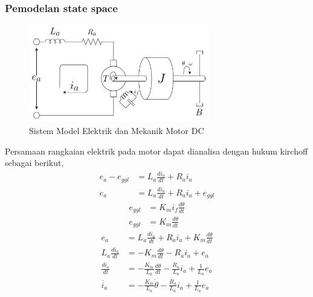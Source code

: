 \documentclass[../main.tex]{subfiles}
\begin{document}
            \subsubsection{Pemodelan state space}
                \begin{figure}[H]
                    \centering\includegraphics[width = 0.7\textwidth]{assets/image/pemodelan_motor.png}
                    \caption{Sistem Model Elektrik dan Mekanik Motor DC}
                    \label{gambar_1}
                \end{figure}
                Persamaan rangkaian elektrik pada motor dapat dianalisa dengan hukum kirchoff sebagai berikut,
                \begin{equation}
                    \begin{split}
                        e_a - e_{ggl} &= L_a\frac{di_a}{dt} + R_a i_a \\[5pt]
                        e_a &= L_a \frac{di_a}{dt} + R_a i_a + e_{ggl}
                    \end{split}
                \end{equation}
                \begin{equation}
                    \begin{split}
                        e_{ggl} &= K_m i_f \frac{d\theta}{dt} \\[5pt]
                        e_{ggl} &= K_m \frac{d\theta}{dt}
                    \end{split}
                \end{equation}
                \begin{equation}
                    \begin{split}
                        e_a &= L_a\frac{di_a}{dt} + R_a i_a + K_m\frac{d\theta}{dt} \\[5pt]
                        L_a\frac{di_a}{dt} &= -K_m\frac{d\theta}{dt} - R_a i_a + e_a \\[5pt]
                        \frac{di_a}{dt} &= -\frac{K_m}{L_a}\frac{d\theta}{dt} - \frac{R_a}{L_a}i_a + \frac{1}{L_a}e_a \\[5pt]
                        \dot{i_a} &= -\frac{K_m}{L_a}\dot{\theta} - \frac{R_a}{L_a}i_a + \frac{1}{L_a}e_a
                    \end{split}
                \end{equation}
\end{document}
